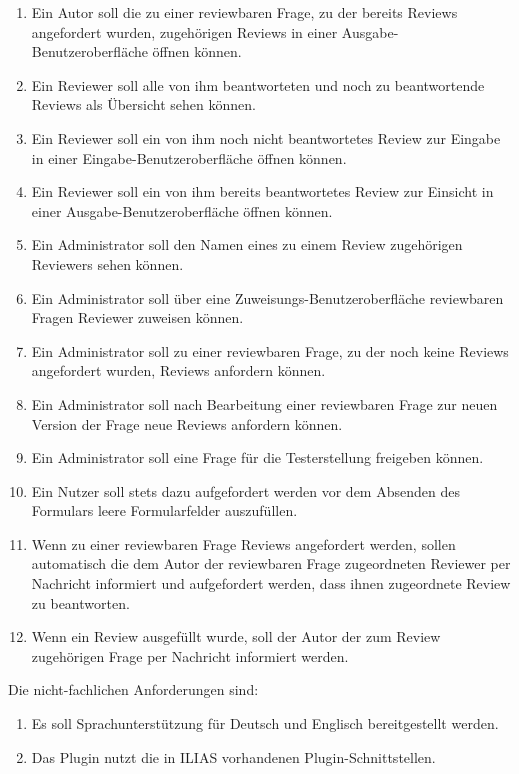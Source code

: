 \documentclass[a4paper]{scrreprt}
\begin{document}
\begin{enumerate}[label= FA \arabic*:]
\item Ein Autor soll die zu einer reviewbaren Frage, zu der bereits Reviews angefordert wurden, zugehörigen Reviews in einer Ausgabe-Benutzeroberfläche öffnen können.
\item Ein Reviewer soll alle von ihm beantworteten und noch zu beantwortende Reviews als Übersicht sehen können.
\item Ein Reviewer soll ein von ihm noch nicht beantwortetes Review zur Eingabe in einer Eingabe-Benutzeroberfläche öffnen können.
\item Ein Reviewer soll ein von ihm bereits beantwortetes Review zur Einsicht in einer Ausgabe-Benutzeroberfläche öffnen können.
\item Ein Administrator soll den Namen eines zu einem Review zugehörigen Reviewers sehen können.
\item Ein Administrator soll über eine Zuweisungs-Benutzeroberfläche reviewbaren Fragen Reviewer zuweisen können.
\item Ein Administrator soll zu einer reviewbaren Frage, zu der noch keine Reviews angefordert wurden, Reviews anfordern können.
\item Ein Administrator soll nach Bearbeitung einer reviewbaren Frage zur neuen Version der Frage neue Reviews  anfordern können.
\item Ein Administrator soll eine Frage für die Testerstellung freigeben können.
\item Ein Nutzer soll stets dazu aufgefordert werden vor dem Absenden des Formulars leere Formularfelder auszufüllen.  
\item Wenn zu einer reviewbaren Frage Reviews angefordert werden, sollen automatisch die dem Autor der reviewbaren Frage zugeordneten Reviewer per Nachricht informiert und aufgefordert werden, dass ihnen zugeordnete Review zu beantworten.
\item Wenn ein Review ausgefüllt wurde, soll der Autor der zum Review zugehörigen Frage per Nachricht informiert werden.
\end{enumerate}


Die nicht-fachlichen Anforderungen sind:
\begin{enumerate}[label=NFA \arabic*:]
\item Es soll Sprachunterstützung für Deutsch und Englisch bereitgestellt werden.
\item Das Plugin nutzt die in ILIAS vorhandenen Plugin-Schnittstellen.
\end{enumerate}
\end{document}
